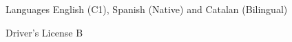 

\begin{cvskills}

\cvskill
  {Languages}
  {English (C1), Spanish (Native) and Catalan (Bilingual)}

\cvskill
  {Driver's License}
  {B}

\end{cvskills}
